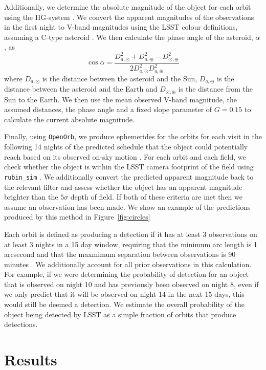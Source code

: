 \documentclass[twocolumn]{aastex631}
\begin{document}
Additionally, we determine the absolute magnitude of the object for each orbit using the HG-system \citep{mpc_h_g}. We convert the apparent magnitudes of the observations in the first night to V-band magnitudes using the LSST colour definitions, assuming a C-type asteroid \citep{Jones+2018}. We then calculate the phase angle of the asteroid, $\alpha$, as
\begin{equation}
    \cos \alpha = \frac{D_{a, \odot}^2 + D_{a, \oplus}^2 - D_{\odot, \oplus}^2}{2 D_{a, \odot}^2 D_{a, \oplus}^2}
\end{equation}
where $D_{a, \odot}$ is the distance between the asteroid and the Sun, $D_{a, \oplus}$ is the distance between the asteroid and the Earth and $D_{\odot, \oplus}$ is the distance from the Sun to the Earth. We then use the mean observed V-band magnitude, the assumed distances, the phase angle and a fixed slope parameter of $G = 0.15$ \citep{mpc_h_g} to calculate the current absolute magnitude.

Finally, using \texttt{OpenOrb}, we produce ephemerides for the orbits for each visit in the following 14 nights of the predicted schedule that the object could potentially reach based on its observed on-sky motion \citep{Granvik+2009}. For each orbit and each field, we check whether the object is within the LSST camera footprint of the field using \texttt{rubin\_sim} \citep{rubin_sim}. We additionally convert the predicted apparent magnitude back to the relevant filter and assess whether the object has an apparent magnitude brighter than the $5\sigma$ depth of field. If both of these criteria are met then we assume an observation has been made. We show an example of the predictions produced by this method in Figure~\ref{fig:circles}

Each orbit is defined as producing a detection if it has at least 3 observations on at least 3 nights in a 15 day window, requiring that the minimum arc length is 1 arcsecond and that the maxmimum separation between observations is 90 minutes \citep{oss}. We additionally account for all prior observations in this calculation. For example, if we were determining the probability of detection for an object that is observed on night 10 and has previously been observed on night 8, even if we only predict that it will be observed on night 14 in the next 15 days, this would still be deemed a detection. We estimate the overall probability of the object being detected by LSST as a simple fraction of orbits that produce detections.

\section{Results} \label{sec:results}
\end{document}
